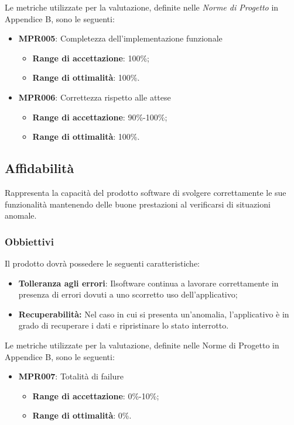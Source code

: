 Le metriche utilizzate per la valutazione, definite nelle \textit{Norme di Progetto} in Appendice B, sono le seguenti:
\begin{itemize}
	\item \textbf{MPR005}: Completezza dell'implementazione funzionale
	\begin{itemize}
		\item \textbf{Range di accettazione}: 100\%;
		\item \textbf{Range di ottimalità}: 100\%.
	\end{itemize}
	\item \textbf{MPR006}: Correttezza rispetto alle attese
	\begin{itemize}
		\item \textbf{Range di accettazione}: 90\%-100\%;
		\item \textbf{Range di ottimalità}: 100\%.
	\end{itemize}
\end{itemize}

\subsection{Affidabilità}
Rappresenta la capacità del prodotto software di svolgere correttamente le sue funzionalità mantenendo delle buone prestazioni al verificarsi di situazioni anomale.

\subsubsection{Obbiettivi} Il prodotto dovrà possedere le seguenti caratteristiche:
\begin{itemize}
	\item \textbf{Tolleranza agli errori}: Ilsoftware continua a lavorare correttamente in presenza di errori dovuti a uno scorretto uso dell'applicativo;
	\item \textbf{Recuperabilità:} Nel caso in cui si presenta un'anomalia, l'applicativo è in grado di recuperare i dati e ripristinare lo stato interrotto.
\end{itemize}

Le metriche utilizzate per la valutazione, definite nelle Norme di Progetto in Appendice B, sono le seguenti:
\begin{itemize}
	\item \textbf{MPR007}: Totalità di failure
	\begin{itemize}
		\item \textbf{Range di accettazione}: 0\%-10\%;
		\item \textbf{Range di ottimalità}: 0\%.
	\end{itemize}
\end{itemize}


